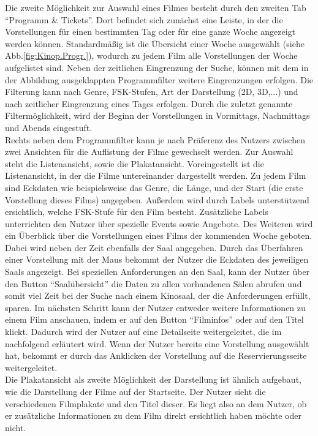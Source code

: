 	Die zweite Möglichkeit zur Auswahl eines Filmes besteht durch den zweiten Tab \enquote{Programm \& Tickets}. Dort befindet sich zunächst eine Leiste, in der die Vorstellungen für einen bestimmten Tag oder für eine ganze Woche angezeigt werden können. Standardmäßig ist die Übersicht einer Woche ausgewählt (siehe Abb.\vref{fig:Kinop.Progr.}), wodurch zu jedem Film alle Vorstellungen der Woche aufgelistet sind. Neben der zeitlichen Eingrenzung der Suche, können mit dem in der Abbildung ausgeklappten Programmfilter weitere Eingrenzungen erfolgen. Die Filterung kann nach Genre, FSK-Stufen, Art der Darstellung (2D, 3D,...) und nach zeitlicher Eingrenzung eines Tages erfolgen. Durch die zuletzt genannte Filtermöglichkeit, wird der Beginn der Vorstellungen in Vormittags, Nachmittags und Abends eingestuft.
	\\Rechts neben dem Programmfilter kann je nach Präferenz des Nutzers zwischen zwei Ansichten für die Auflistung der Filme gewechselt werden. Zur Auswahl steht die Listenansicht, sowie die Plakatansicht. Voreingestellt ist die Listenansicht, in der die Filme untereinander dargestellt werden. Zu jedem Film sind Eckdaten wie beispielsweise das Genre, die Länge, und der Start (die erste Vorstellung dieses Films) angegeben. Außerdem wird durch Labels unterstützend ersichtlich, welche FSK-Stufe für den Film besteht. Zusätzliche Labels unterrichten den Nutzer über spezielle Events sowie Angebote. Des Weiteren wird ein Überblick über die Vorstellungen eines Films der kommenden Woche geboten. Dabei wird neben der Zeit ebenfalls der Saal angegeben. Durch das Überfahren einer Vorstellung mit der Maus bekommt der Nutzer die Eckdaten des jeweiligen Saals angezeigt. Bei speziellen Anforderungen an den Saal, kann der Nutzer über den Button \enquote{Saalübersicht} die Daten zu allen vorhandenen Sälen abrufen und somit viel Zeit bei der Suche nach einem Kinosaal, der die Anforderungen erfüllt, sparen. Im nächsten Schritt kann der Nutzer entweder weitere Informationen zu einem Film anschauen, indem er auf den Button \enquote{Filminfos} oder auf den Titel klickt. Dadurch wird der Nutzer auf eine Detailseite weitergeleitet, die im nachfolgend erläutert wird. Wenn der Nutzer bereits eine Vorstellung ausgewählt hat, bekommt er durch das Anklicken der Vorstellung auf die Reservierungsseite weitergeleitet. 
	\\Die Plakatansicht als zweite Möglichkeit der Darstellung ist ähnlich aufgebaut, wie die Darstellung der Filme auf der Startseite. Der Nutzer sieht die verschiedenen Filmplakate und den Titel dieser. Es liegt also an dem Nutzer, ob er zusätzliche Informationen zu dem Film direkt ersichtlich haben möchte oder nicht.  
